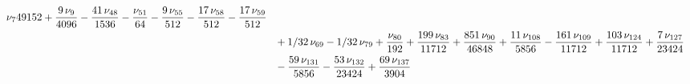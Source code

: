 \documentclass[a4paper,12pt, DIV=14, BCOR=5mm, twoside, headsepline]{scrbook}
\begin{document}
\begin{align}
\begin{aligned}
{{\nu_{{7}}}{49152}}+{\frac {9\,\nu_{{9}}}{4096}}-{\frac {41\,\nu_{{48}}
}{1536}}-{\frac {\nu_{{51}}}{64}}-{\frac {9\,\nu_{{55}}}{512}}-{\frac 
{17\,\nu_{{58}}}{512}}-{\frac {17\,\nu_{{59}}}{512}}\\
 &\hphantom{=}+1/32\,\nu_{{69}}-
1/32\,\nu_{{79}}+{\frac {\nu_{{80}}}{192}}+{\frac {199\,\nu_{{83}}}{
11712}}+{\frac {851\,\nu_{{90}}}{46848}}+{\frac {11\,\nu_{{108}}}{5856
}}-{\frac {161\,\nu_{{109}}}{11712}}+{\frac {103\,\nu_{{124}}}{11712}}
+{\frac {7\,\nu_{{127}}}{23424}}\\
 &\hphantom{=}-{\frac {59\,\nu_{{131}}}{5856}}-{
\frac {53\,\nu_{{132}}}{23424}}+{\frac {69\,\nu_{{137}}}{3904}}
\end{aligned}
\end{align}
\printbibliography
\end{document}
